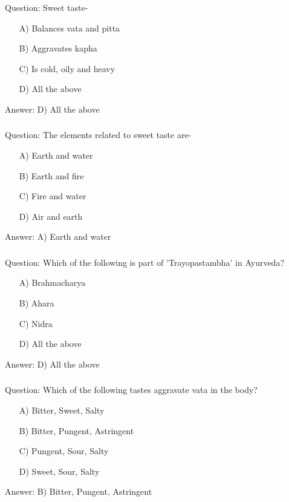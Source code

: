 \begin{frame}[fragile]\frametitle{}

Question: Sweet taste-

\begin{itemize}
\item[A)] Balances vata and pitta
\item[B)] Aggravates kapha
\item[C)] Is cold, oily and heavy
\item[D)] All the above
\end{itemize}

Answer: D) All the above
\end{frame}

\begin{frame}[fragile]\frametitle{}

Question: The elements related to sweet taste are-

\begin{itemize}
\item[A)] Earth and water
\item[B)] Earth and fire
\item[C)] Fire and water
\item[D)] Air and earth
\end{itemize}

Answer: A) Earth and water
\end{frame}

\begin{frame}[fragile]\frametitle{}

Question: Which of the following is part of 'Trayopastambha' in Ayurveda?

\begin{itemize}
\item[A)] Brahmacharya
\item[B)] Ahara
\item[C)] Nidra
\item[D)] All the above
\end{itemize}

Answer: D) All the above
\end{frame}

\begin{frame}[fragile]\frametitle{}

Question: Which of the following tastes aggravate vata in the body?

\begin{itemize}
\item[A)] Bitter, Sweet, Salty
\item[B)] Bitter, Pungent, Astringent
\item[C)] Pungent, Sour, Salty
\item[D)] Sweet, Sour, Salty
\end{itemize}

Answer: B) Bitter, Pungent, Astringent
\end{frame}

